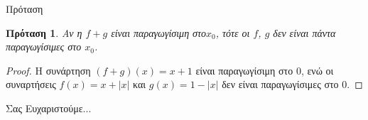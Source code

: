 \documentclass[greek]{beamer}
\newtheorem{proposition}[theorem]{Πρόταση}
\begin{document}
\begin{frame}{Πρόταση}
 \begin{proposition}
  \normalfont Αν η $f+g$ είναι παραγωγίσιμη στο${{x}_{0}}$, τότε οι $f$, $g$ δεν είναι πάντα παραγωγίσιμες στο ${{x}_{0}}$.
 \end{proposition}
 \begin{proof}
  H συνάρτηση $\left( f+g \right)\left( x \right)=x+1$ είναι παραγωγίσιμη στο $0$, ενώ οι συναρτήσεις $f\left( x \right)=x+\left| x \right|$ και $g\left( x \right)=1-\left| x \right|$ δεν είναι παραγωγίσιμες στο $0$.
 \end{proof}
\end{frame}

\begin{frame}[plain,c]
 \begin{center}
  \Huge Σας Ευχαριστούμε...
 \end{center}
\end{frame}
\end{document}
